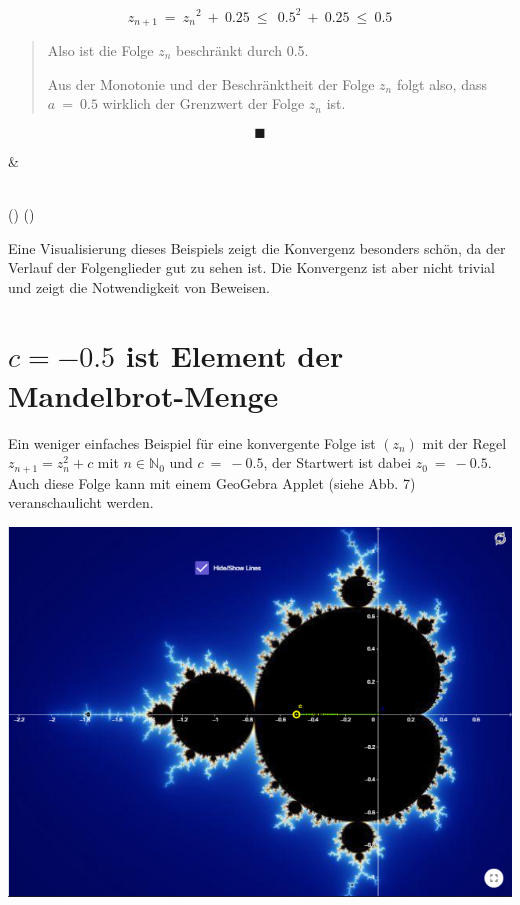 \documentclass[a4paper, 12pt]{book}
\begin{document}
\begin{longtable}[]
\begin{minipage}[b]{\linewidth}
\[z_{n + 1}\  = \ {z_{n}}^{2}\  + \ 0.25\  \leq \ \ {0.5}^{2}\  + \ 0.25\  \leq \ 0.5\]

\begin{quote}
Also ist die Folge \(z_{n}\) beschränkt durch 0.5.

Aus der Monotonie und der Beschränktheit der Folge \(z_{n}\) folgt also,
dass \(a\  = \ 0.5\) wirklich der Grenzwert der Folge \(z_{n}\) ist.
\end{quote}

\[\blacksquare\]
\end{minipage} & \begin{minipage}[b]{\linewidth}\raggedright
\end{minipage} \\
\midrule()
\endhead
\bottomrule()
\end{longtable}

Eine Visualisierung dieses Beispiels zeigt die Konvergenz besonders
schön, da der Verlauf der Folgenglieder gut zu sehen ist. Die Konvergenz
ist aber nicht trivial und zeigt die Notwendigkeit von Beweisen.

\section{$c=-0.5$ ist Element der Mandelbrot-Menge}

Ein weniger einfaches Beispiel für eine konvergente Folge ist
\(\left( z_{n} \right)\) mit der Regel \(z_{n + 1} = z_{n}^{2} + c\) mit
\(n \in \mathbb{N}_{0}\) und \(c\  = \  - 0.5\), der Startwert ist dabei
\(z_{0}\  = \  - 0.5\). Auch diese Folge kann mit einem GeoGebra Applet
(siehe Abb. 7) veranschaulicht werden.

\includegraphics[width=\linewidth]{image12.png}
\end{document}
